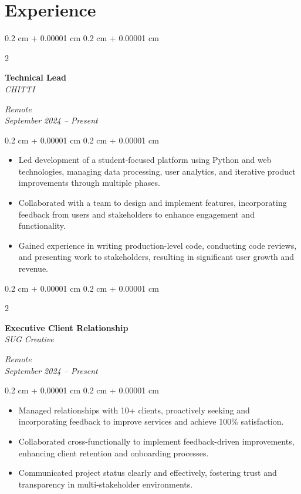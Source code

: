 \documentclass[10pt, letterpaper]{article}
\newenvironment{highlights}{
    \begin{itemize}[
        topsep=0.10 cm,
        parsep=0.10 cm,
        partopsep=0pt,
        itemsep=0pt,
        leftmargin=0.4 cm + 10pt
    ]
}{
    \end{itemize}
} %
\newenvironment{onecolentry}{
    \begin{adjustwidth}{
        0.2 cm + 0.00001 cm
    }{
        0.2 cm + 0.00001 cm
    }
}{
    \end{adjustwidth}
} %
\newenvironment{twocolentry}[2][]{
    \onecolentry
    \def\secondColumn{#2}
    \setcolumnwidth{\fill, 4.5 cm}
    \begin{paracol}{2}
}{
    \switchcolumn \raggedleft \secondColumn
    \end{paracol}
    \endonecolentry
} %
\begin{document}
    \section{Experience}
    \begin{twocolentry}{
        \textit{Remote} \\
        \textit{September 2024 – Present}
    }
        \textbf{Technical Lead} \\
        \textit{CHITTI}
    \end{twocolentry}
    \vspace{0.10 cm}
    \begin{onecolentry}
        \begin{highlights}
            \item Led development of a student-focused platform using Python and web technologies, managing data processing, user analytics, and iterative product improvements through multiple phases.
            \item Collaborated with a team to design and implement features, incorporating feedback from users and stakeholders to enhance engagement and functionality.
            \item Gained experience in writing production-level code, conducting code reviews, and presenting work to stakeholders, resulting in significant user growth and revenue.
        \end{highlights}
    \end{onecolentry}
    \vspace{0.2 cm}
    \begin{twocolentry}{
        \textit{Remote} \\
        \textit{September 2024 – Present}
    }
        \textbf{Executive Client Relationship} \\
        \textit{SUG Creative}
    \end{twocolentry}
    \vspace{0.10 cm}
    \begin{onecolentry}
        \begin{highlights}
            \item Managed relationships with 10+ clients, proactively seeking and incorporating feedback to improve services and achieve 100\% satisfaction.
            \item Collaborated cross-functionally to implement feedback-driven improvements, enhancing client retention and onboarding processes.
            \item Communicated project status clearly and effectively, fostering trust and transparency in multi-stakeholder environments.
        \end{highlights}
    \end{onecolentry}
\end{document}
